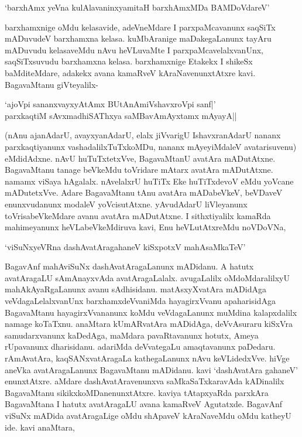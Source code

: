 \begin{shloka}
`barxhAmx yeVna kulAlavaninxyamitaH barxhAmxMDa BAMDoVdareV'
\end{shloka}

barxhamxnige oMdu kelasavide, adeVneMdare I parxpaMcavanunx saqSiTx mADuvudeV barxhamxna kelasa. kuMbAranige maDakegaLanunx tayAru mADuvudu kelasaveMdu nAvu heVLuvaMte I parxpaMcavelalxvanUnx, saqSiTxsuvudu barxhamxna kelasa. barxhamxnige Etakekx I shikeSx baMditeMdare, adakekx avana kamaRveV kAraNavenunxtAtxre kavi. BagavaMtanu giVteyalilx-

\begin{shloka}
`ajoV\s pi sananxvayxyAtAmx BUtAnAmiVshavxroV\s pi sanf|'\\
parxkaqtiM sAvxmadhiSAThxya saMBavAmAyxtamx mAyayA||
\end{shloka}

(nAnu ajanAdarU, avayxyanAdarU, elalx jiVvarigU IshavxranAdarU nananx parxkaqtiyanunx vashadalilxTuTxkoMDu, nananx mAyeyiMdaleV avatarisuvenu) eMdidAdxne. nAvU huTuTxtetxVve, BagavaMtanU avatAra mADutAtxne. BagavaMtanu tanage beVkeMdu toVridare mAtarx avatAra mADutAtxne. namamx viSaya hAgalalx. nAvelalxrU huTiTx Eke huTiTxdevoV eMdu yoVcane mADutetxVve. Adare BagavaMtanu tAnu avatAra mADabeVkeV, beVDaveV enunxvudanunx modaleV yoVcisutAtxne. yAvudAdarU liVleyanunx toVrisabeVkeMdare avanu avatAra mADutAtxne. I sithxtiyalilx kamaRda mahimeyanunx heVLabeVkeMdiruva kavi, Enu heVLutAtxreMdu noVDoVNa,

\begin{shloka}
`viSuNxyeVRna dashAvatAragahaneV kiSxpotxV mahAsaMkaTeV'
\end{shloka}

BagavAnf mahAviSuNx dashAvatAragaLanunx mADidanu. A hatutx avatAragaLU sAmAnayxvAda avatAragaLalalx. avugaLalilx oMdoMdaralilxyU mahAkAyaRgaLanunx avanu sAdhisidanu. matAsxyXvatAra mADidAga veVdagaLelalxvanUnx barxhamxdeVvaniMda hayagirxVvanu apaharisidAga BagavaMtanu hayagirxVvananunx koMdu veVdagaLanunx muMdina kalapxdalilx namage koTaTxnu. anaMtara kUmARvatAra mADidAga, deVvAsuraru kiSxVra samudarxvanunx kaDedAga, maMdara pavaRtavanunx hotutx, Ameya rUpavanunx dharisidanu. adariMda deVvategaLu amaqtavanunx paDedaru. rAmAvatAra, kaqSANxvatAragaLa kathegaLanunx nAvu keVLidedxVve. hiVge aneVka avatAragaLanunx BagavaMtanu mADidanu. kavi `dashAvatAra gahaneV' enunxtAtxre. aMdare dashAvatAravenunxva saMkaSaTxkaravAda kADinalilx BagavaMtanu sikikxkoMDanenunxtAtxre. kaviya tAtapxyaRda parxkAra BagavaMtana I hatutx avatAragaLU avana kamaRveV Agutatxde. BagavAnf viSuNx mADida avatAragaLige oMdu shApaveV kAraNaveMdu oMdu katheyU ide. kavi anaMtara,

